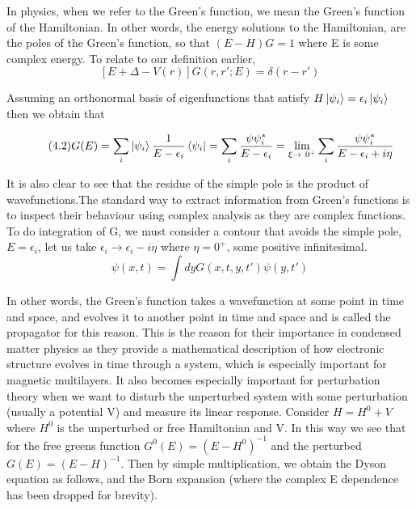 \documentclass[12pt]{article}
\begin{document}
In physics, when we refer to the Green's function, we mean the Green's function of the Hamiltonian. In other words, the energy solutions to the Hamiltonian, are the poles of the Green's function, so that $(E-H)G=1$ where E is some complex energy. To relate to our definition earlier,
\begin{equation} \label{4.1} \tag{4.1}
[E+\Delta -V(r)]G(r,r';E)=\delta (r-r')
\end{equation}

Assuming an orthonormal basis of eigenfunctions that satisfy $H\ket{\psi_i}=\epsilon_i \ket{\psi_i}$ then we obtain that 

\begin{equation} \label{4.1} \tag{4.2}
G(E) = \sum_i \ket{\psi_i} \frac{1}{E-\epsilon_i} \bra{\psi_i}=\sum_i \frac{\psi \psi_i^*}{E-\epsilon_i}=\lim_{\xi\to\ 0^+} \sum_i \frac{\psi \psi_i^*}{E-\epsilon_i+i\eta}
\end{equation}


It is also clear to see that the residue of the simple pole is the product of wavefunctions.The standard way to extract information from Green's functions is to inspect their behaviour using complex analysis as they are complex functions. To do integration of G, we must consider a contour that avoids the simple pole, $E=\epsilon_i$, let us take $\epsilon_i \rightarrow \epsilon_i-i\eta$ where $\eta=0^+$, some positive infinitesimal.
\begin{equation} \label{4.1} \tag{4.3}
\psi(x,t)=\int dy G(x,t,y,t')\psi(y,t')
\end{equation}

In other words, the Green's function takes a wavefunction at some point in time and space, and evolves it to another point in time and space and is called the propagator for this reason. This is the reason for their importance in condensed matter physics as they provide a mathematical description of how electronic structure evolves in time through a system, which is especially important for magnetic multilayers. It also becomes especially important for perturbation theory when we want to disturb the unperturbed system with some perturbation (usually a potential V) and measure its linear response. Consider $H=H^0+V$ where $H^0$ is the unperturbed or free Hamiltonian and V. In this way we see that for the free greens function $G^0(E)=(E-H^0)^{-1}$ and the perturbed $G(E)=(E-H)^{-1}$. Then by simple multiplication, we obtain the Dyson equation as follows, and the Born expansion (where the complex E dependence has been dropped for brevity).
\end{document}

